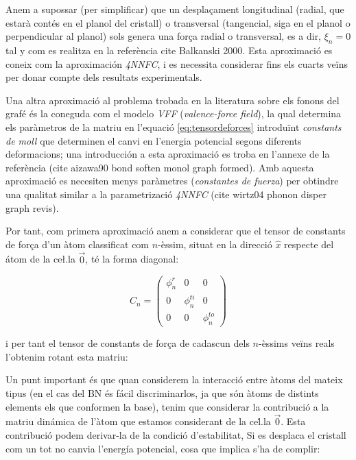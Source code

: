 \documentclass[12pt,twoside,a4paper]{article}%
\begin{document}
Anem a supossar (per simplificar) que un despla\c{c}ament longitudinal (radial, que estarà contés en el planol del cristall) o transversal (tangencial, siga en el planol o perpendicular al planol) sols genera una for\c{c}a radial o transversal, es a dir, $\xi_n=0$ tal y com es realitza en la referència cite Balkanski 2000. Esta aproximació es coneix com la aproximación \textit{4NNFC}, i es necessita considerar fins els cuarts veïns per donar compte dels resultats experimentals.





Una altra aproximació al problema trobada en la literatura sobre els fonons del grafé és la coneguda com el modelo \textit{VFF} (\textit{valence-force field}), la qual determina els paràmetros de la matriu en l'equació \ref{eq:tensordeforces} introduïnt \textit{constants de moll} que determinen el canvi en l'energia potencial segons diferents deformacions; una introducción a esta aproximació es troba en l'annexe de la referència (cite aizawa90 bond soften monol graph formed). Amb aquesta aproximació 
es necesiten menys paràmetres (\textit{constantes de fuerza}) per  obtindre una qualitat similar a la parametrizació \textit{4NNFC} (cite wirtz04 phonon disper graph revis).

Por tant, com primera aproximació anem a considerar que el tensor de constants de for\c{c}a  d'un àtom classificat com $n$-èssim, situat en la direcció $\hat x$ respecte del átom de la ce\l.la $\vec 0$, té la forma diagonal:

\begin{equation}
C_n=\begin{pmatrix}
\phi_n^r& 0 &0\\
0 & \phi_n^{ti} & 0 \\
0 & 0 & \phi_n^{to}
\end{pmatrix}
\end{equation}

i per tant el tensor de constants de for\c{c}a de cadascun dels $n$-èssims veïns reals l'obtenim rotant esta matriu:
\vspace{4cm}


Un punt important és que quan considerem la interacció entre àtoms del mateix tipus (en el cas del BN és fácil discriminarlos, ja que són àtoms de distints elements els que conformen la base), tenim que considerar la contribució a la matriu dinámica de l'àtom que estamos considerant de la ce\.l.la $\vec 0$. Esta contribució podem derivar-la de la condició d'estabilitat, \cite{falkovsky08_symmet_const_phonon_disper_graph}
\cite{wirtz04_phonon_disper_graph_revis}
Si es desplaca el cristall com un tot no canvia l'energía potencial, cosa que implica s'ha de complir:
\end{document}
